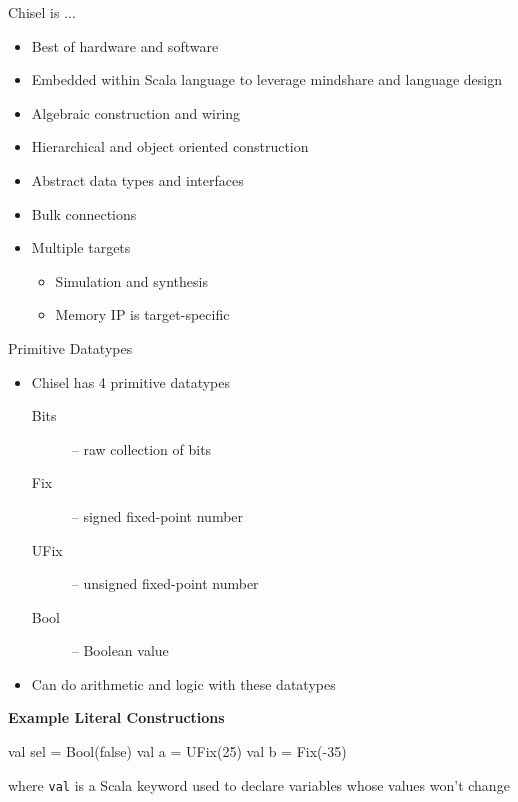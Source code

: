 \documentclass[xcolor=pdflatex,dvipsnames,table]{beamer}
\begin{document}
\begin{frame}[fragile]{Chisel is ...}
\begin{itemize}
\item Best of hardware and software
\item Embedded within Scala language to leverage mindshare and language design
\item Algebraic construction and wiring
\item Hierarchical and object oriented construction
\item Abstract data types and interfaces
\item Bulk connections
\item Multiple targets
\begin{itemize}
\item Simulation and synthesis
\item Memory IP is target-specific
\end{itemize}
\end{itemize}
\end{frame}

\begin{frame}[fragile]{Primitive Datatypes}
\begin{itemize}
\item{Chisel has 4 primitive datatypes}
\begin{description}
\item[Bits]  -- raw collection of bits
\item[Fix]   -- signed fixed-point number
\item[UFix] -- unsigned fixed-point number
\item[Bool] -- Boolean value
\end{description}
\item Can do arithmetic and logic with these datatypes
\end{itemize}

\textbf{Example Literal Constructions}
\begin{scala}
val sel = Bool(false)
val a   = UFix(25)
val b   = Fix(-35)
\end{scala}
where \verb+val+ is a Scala keyword used to declare variables whose values won't change
\end{frame}
\end{document}
